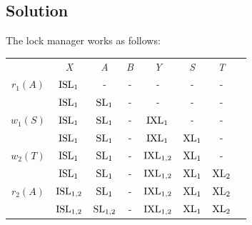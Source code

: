 \documentclass[12pt, a4paper]{report}
\newtheorem[style=M,bodystyle=\normalfont]{theorem}{Theorem}
\newtheorem[style=M,bodystyle=\normalfont]{corollary}{Corollary}
\newtheorem[style=M,bodystyle=\normalfont]{lemma}{Lemma}
\newtheorem[style=M,bodystyle=\normalfont]{definition}{Definition}
\begin{document}
    \subsection*{Solution}
        The lock manager works as follows: 
        \begin{table}[H]
            \centering
            \begin{tabular}{c|cccccc|c}
            \cline{2-7}
            \textit{}                          & \textit{X}               & \textit{A}              & \textit{B} & \textit{Y}               & \textit{S}          & \textit{T}          & \textit{}    \\ \cline{1-7}
            \multicolumn{1}{|c|}{$r_1(A)$}     & $\textnormal{ISL}_1$     & -                       & -          & -                        & -                   & -                   &              \\
            \multicolumn{1}{|c|}{}             & $\textnormal{ISL}_1$     & $\textnormal{SL}_1$     & -          & -                        & -                   & -                   &              \\
            \multicolumn{1}{|c|}{$w_1(S)$}     & $\textnormal{ISL}_1$     & $\textnormal{SL}_1$     & -          & $\textnormal{IXL}_1$     & -                   & -                   &              \\
            \multicolumn{1}{|c|}{}             & $\textnormal{ISL}_1$     & $\textnormal{SL}_1$     & -          & $\textnormal{IXL}_1$     & $\textnormal{XL}_1$ & -                   &              \\
            \multicolumn{1}{|c|}{$w_2(T)$}     & $\textnormal{ISL}_1$     & $\textnormal{SL}_1$     & -          & $\textnormal{IXL}_{1,2}$ & $\textnormal{XL}_1$ & -                   &              \\
            \multicolumn{1}{|c|}{}             & $\textnormal{ISL}_1$     & $\textnormal{SL}_1$     & -          & $\textnormal{IXL}_{1,2}$ & $\textnormal{XL}_1$ & $\textnormal{XL}_2$ &              \\
            \multicolumn{1}{|c|}{$r_2(A)$}     & $\textnormal{ISL}_{1,2}$ & $\textnormal{SL}_1$     & -          & $\textnormal{IXL}_{1,2}$ & $\textnormal{XL}_1$ & $\textnormal{XL}_2$ &              \\
            \multicolumn{1}{|c|}{}             & $\textnormal{ISL}_{1,2}$ & $\textnormal{SL}_{1,2}$ & -          & $\textnormal{IXL}_{1,2}$ & $\textnormal{XL}_1$ & $\textnormal{XL}_2$ &              \\

\end{tabular}
\end{table}
\end{document}
